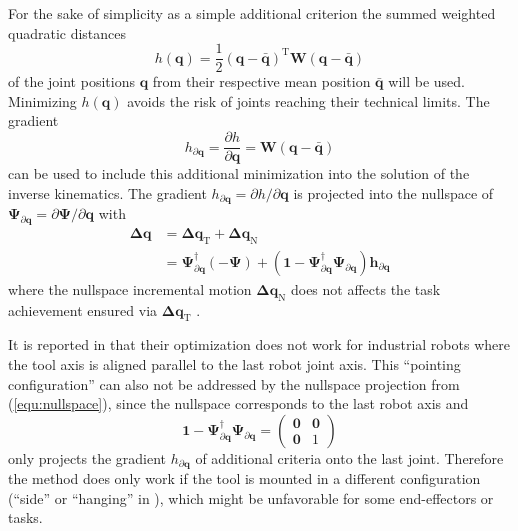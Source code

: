 \documentclass[twocolumn,10pt]{IFTOMM}
\newcommand{\bm}[1]{\boldsymbol{#1}}
\newcommand{\transp}[0]{{\mathrm{T}}}
\begin{document}
For the sake of simplicity as a simple additional criterion the summed weighted quadratic distances
%
\begin{equation}
h(\bm{q})
=
\frac{1}{2} (\bm{q}-\bar{\bm{q}})^\transp\bm{W}(\bm{q}-\bar{\bm{q}})
\end{equation}  
%
of the joint positions $\bm{q}$ from their respective mean position $\bar{\bm{q}}$ will be used.
Minimizing $h(\bm{q})$ avoids the risk of joints reaching their technical limits.
The gradient
%
\begin{equation}
h_{\partial\bm{q}}
=
\frac{\partial h}{\partial \bm{q}}
=
\bm{W}(\bm{q}-\bar{\bm{q}})
\end{equation}
%
can be used to include this additional minimization into the solution of the inverse kinematics.
The gradient $h_{\partial\bm{q}}=\partial h/\partial \bm{q}$ is projected into the nullspace of $\bm{\Psi}_{\partial\bm{q}}=\partial \bm{\Psi}/\partial \bm{q}$ with
%
\begin{align}
\bm{\Delta}\bm{q}
&=
\bm{\Delta}\bm{q}_{\mathrm{T}} + \bm{\Delta}\bm{q}_{\mathrm{N}} \nonumber \\
&=
\bm{\Psi}_{\partial\bm{q}}^{\dagger} (-\bm{\Psi}) +  (\bm{1}-\bm{\Psi}_{\partial\bm{q}}^{\dagger}\bm{\Psi}_{\partial\bm{q}}) \bm{h}_{\partial\bm{q}}
\label{equ:nullspace}
\end{align}
%
where the nullspace incremental motion $\bm{\Delta}\bm{q}_{\mathrm{N}}$ does not affects the task achievement ensured via $\bm{\Delta}\bm{q}_{\mathrm{T}}$ \cite{Yoshikawa1984}.

It is reported in \cite{GuoDonKe2015} that their optimization does not work for industrial robots where the tool axis is aligned parallel to the last robot joint axis.
This ``pointing configuration'' can also not be addressed by the nullspace projection from (\ref{equ:nullspace}), since the nullspace corresponds to the last robot axis and
%
\begin{equation}
\bm{1}-\bm{\Psi}_{\partial\bm{q}}^{\dagger}\bm{\Psi}_{\partial\bm{q}}
=
\begin{pmatrix}
\bm{0} & \bm{0} \\
\bm{0} & 1
\end{pmatrix}
\end{equation}
%
only projects the gradient $h_{\partial\bm{q}}$ of additional criteria onto the last joint.
Therefore the method does only work if the tool is mounted in a different configuration (``side'' or ``hanging'' in \cite{GuoDonKe2015}), which might be unfavorable for some end-effectors or tasks.
\end{document}
